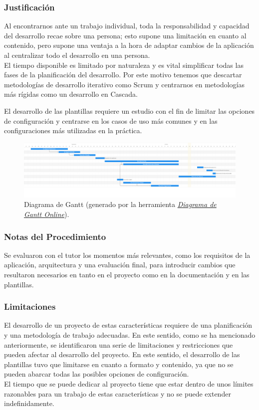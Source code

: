 \documentclass[12pt, a4paper, twoside]{article}
\begin{document}
\subsubsection{Justificación}
Al encontrarnos ante un trabajo individual, toda la responsabilidad y capacidad del desarrollo recae sobre una persona; esto supone una limitación en cuanto al contenido, pero supone una ventaja 
a la hora de adaptar cambios de la aplicación al centralizar todo el desarrollo en una persona. \\ 
El tiempo disponible es limitado por naturaleza y es vital simplificar todas las fases de la planificación del desarrollo. Por este motivo tenemos que descartar metodologías de desarrollo iterativo como Scrum y centrarnos en metodologías más rígidas como un desarrollo en Cascada.

El desarrollo de las plantillas requiere un estudio con el fin de limitar las opciones de configuración y centrarse en los casos de uso más comunes y en las configuraciones más utilizadas en la práctica.

\begin{figure}[ht]
	\centering
		\includegraphics[width=1\textwidth]{gantt.png} 
	\caption{Diagrama de Gantt (generado por la herramienta \href{https://www.plandemejora.com/crear-diagrama-de-gantt-online/}{\emph{Diagrama de Gantt Online}}).} 
\end{figure}

\subsubsection{Notas del Procedimiento}
Se evaluaron con el tutor los momentos más relevantes, como los requisitos de la aplicación, arquitectura y una evaluación final, para introducir cambios que resultaron necesarios en tanto en el proyecto como en la documentación y en las plantillas.

\subsubsection{Limitaciones}
El desarrollo de un proyecto de estas características requiere de una planificación y una metodología de trabajo adecuadas.
En este sentido, como se ha mencionado anteriormente, se identificaron una serie de limitaciones y restricciones que pueden afectar al desarrollo del proyecto.
En este sentido, el desarrollo de las plantillas tuvo que limitarse en cuanto a formato y contenido, ya que no se pueden abarcar todas las posibles opciones de configuración.
\\El tiempo que se puede dedicar al proyecto tiene que estar dentro de unos límites razonables para un trabajo de estas características y no se puede extender indefinidamente.
\end{document}
